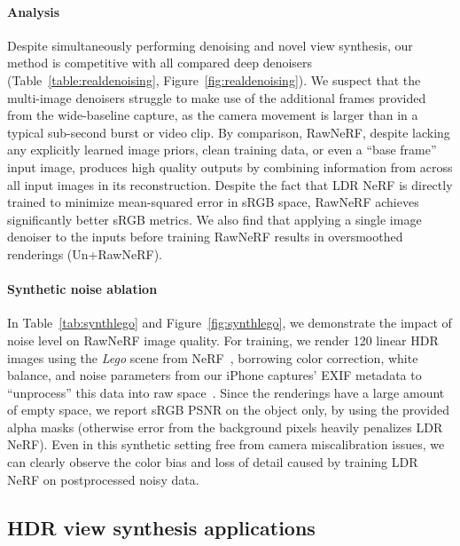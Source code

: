 \paragraph{Analysis} Despite simultaneously performing denoising and novel view synthesis, our method is competitive with all compared deep denoisers (Table~\ref{table:realdenoising}, Figure~\ref{fig:realdenoising}). We suspect that the multi-image denoisers struggle to make use of the additional frames provided from the wide-baseline capture, as the camera movement is larger than in a typical sub-second burst or video clip. By comparison, RawNeRF, despite lacking any explicitly learned image priors, clean training data, or even a ``base frame'' input image, produces high quality outputs by combining information from across all input images in its reconstruction. 
Despite the fact that LDR NeRF is directly trained to minimize mean-squared error in sRGB space, RawNeRF achieves significantly better sRGB metrics.
We also find that applying a single image denoiser to the inputs before training RawNeRF results in oversmoothed renderings (Un+RawNeRF).



\paragraph{Synthetic noise ablation} In Table~\ref{tab:synthlego} and Figure~\ref{fig:synthlego}, we demonstrate the impact of noise level on RawNeRF image quality. For training, we render 120 linear HDR images using the \emph{Lego} scene from NeRF~\cite{mildenhall2020nerf}, borrowing color correction, white balance, and noise parameters from our iPhone captures' EXIF metadata to ``unprocess'' this data into raw space~\cite{brooks2019cvpr}. Since the renderings have a large amount of empty space, we report sRGB PSNR on the object only, by using the provided alpha masks (otherwise error from the background pixels heavily penalizes LDR NeRF). Even in this synthetic setting free from camera miscalibration issues, we can clearly observe the color bias and loss of detail caused by training LDR NeRF on postprocessed noisy data. 





\subsection{HDR view synthesis applications}



